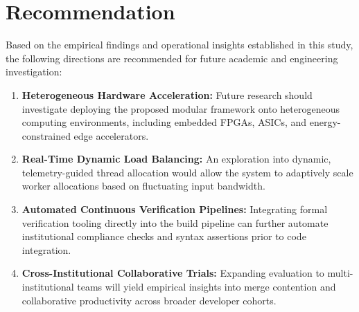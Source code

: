 \chapter{Recommendation}
\label{ch:recommendation}

Based on the empirical findings and operational insights established in this study, the following directions are recommended for future academic and engineering investigation:
\begin{enumerate}
    \item \textbf{Heterogeneous Hardware Acceleration:} Future research should investigate deploying the proposed modular framework onto heterogeneous computing environments, including embedded FPGAs, ASICs, and energy-constrained edge accelerators.
    \item \textbf{Real-Time Dynamic Load Balancing:} An exploration into dynamic, telemetry-guided thread allocation would allow the system to adaptively scale worker allocations based on fluctuating input bandwidth.
    \item \textbf{Automated Continuous Verification Pipelines:} Integrating formal verification tooling directly into the build pipeline can further automate institutional compliance checks and syntax assertions prior to code integration.
    \item \textbf{Cross-Institutional Collaborative Trials:} Expanding evaluation to multi-institutional teams will yield empirical insights into merge contention and collaborative productivity across broader developer cohorts.
\end{enumerate}
